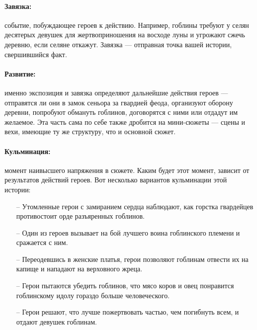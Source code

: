 \paragraph{Завязка:} событие, побуждающее героев к действию. Например, гоблины требуют у селян десятерых девушек для жертвоприношения на восходе луны и угрожают сжечь деревню, если селяне откажут. Завязка — отправная точка вашей истории, свершившийся факт.
\paragraph{Развитие:} именно экспозиция и завязка определяют дальнейшие действия героев — отправятся ли они в замок сеньора за гвардией феода, организуют оборону деревни, попробуют обмануть гоблинов, договорятся с ними или отдадут им желаемое. Эта часть сама по себе также дробится на мини-сюжеты — сцены и вехи, имеющие ту же структуру, что и основной сюжет.
\paragraph{Кульминация:} момент наивысшего напряжения в сюжете. Каким будет этот момент, зависит от результатов действий героев. Вот несколько вариантов кульминации этой истории:
\begin{itemize}
\item[--] Утомленные герои с замиранием сердца наблюдают, как горстка гвардейцев противостоит орде разъяренных гоблинов.
\item[--] Один из героев вызывает на бой лучшего воина гоблинского племени и сражается с ним.
\item[--] Переодевшись в женские платья, герои позволяют гоблинам отвести их на капище и нападают на верховного жреца.
\item[--] Герои пытаются убедить гоблинов, что мясо коров и овец понравится гоблинскому идолу гораздо больше человеческого.
\item[--] Герои решают, что лучше пожертвовать частью, чем погибнуть всем, и отдают девушек гоблинам.
\end{itemize}
